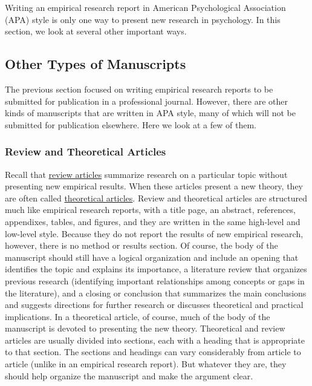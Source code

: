 \documentclass[
]{krantz}
\begin{document}
Writing an empirical research report in American Psychological Association (APA) style is only one way to present new research in psychology. In this section, we look at several other important ways.

\subsection*{Other Types of Manuscripts}\label{other-types-of-manuscripts}


The previous section focused on writing empirical research reports to be submitted for publication in a professional journal. However, there are other kinds of manuscripts that are written in APA style, many of which will not be submitted for publication elsewhere. Here we look at a few of them.

\subsubsection*{Review and Theoretical Articles}\label{review-and-theoretical-articles}


Recall that \hyperref[review-article]{review articles} summarize research on a particular topic without presenting new empirical results. When these articles present a new theory, they are often called \hyperref[theoretical-article]{theoretical articles}. Review and theoretical articles are structured much like empirical research reports, with a title page, an abstract, references, appendixes, tables, and figures, and they are written in the same high-level and low-level style. Because they do not report the results of new empirical research, however, there is no method or results section. Of course, the body of the manuscript should still have a logical organization and include an opening that identifies the topic and explains its importance, a literature review that organizes previous research (identifying important relationships among concepts or gaps in the literature), and a closing or conclusion that summarizes the main conclusions and suggests directions for further research or discusses theoretical and practical implications. In a theoretical article, of course, much of the body of the manuscript is devoted to presenting the new theory. Theoretical and review articles are usually divided into sections, each with a heading that is appropriate to that section. The sections and headings can vary considerably from article to article (unlike in an empirical research report). But whatever they are, they should help organize the manuscript and make the argument clear.
\end{document}
